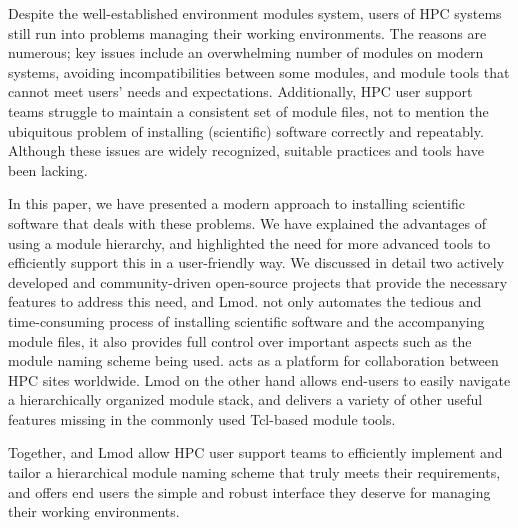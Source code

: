 Despite the well-established environment modules system, users of HPC systems still
run into problems managing their working environments. The reasons are numerous; key
issues include an overwhelming number of modules on modern systems, avoiding
incompatibilities between some modules, and module tools that cannot meet users' needs 
and expectations. Additionally, HPC user support teams struggle to maintain a
consistent set of module files, not to mention the ubiquitous problem of
installing (scientific) software correctly and repeatably. Although these issues are
widely recognized, suitable practices and tools have been lacking.

In this paper, we have presented a modern approach to installing scientific software
that deals with these problems. We have explained the advantages of
using a module hierarchy, and highlighted the need for more advanced tools to
efficiently support this in a user-friendly way. We discussed in detail two
actively developed and community-driven open-source projects that provide the
necessary features to address this need, \easybuild{} and Lmod. \easybuild{} not only
automates the tedious and time-consuming process of installing scientific software
and the accompanying module files, it also provides full control over important
aspects such as the module naming scheme being used. \easybuild{} acts as a platform
for collaboration between HPC sites worldwide. Lmod on the other hand allows end-users
to easily navigate a hierarchically organized module stack, and delivers a variety of
other useful features missing in the commonly used Tcl-based module tools.

Together, \easybuild{} and Lmod allow HPC user support teams to efficiently implement
and tailor a hierarchical module naming scheme that truly meets their requirements,
and offers end users the simple and robust interface they deserve for managing their
working environments.
